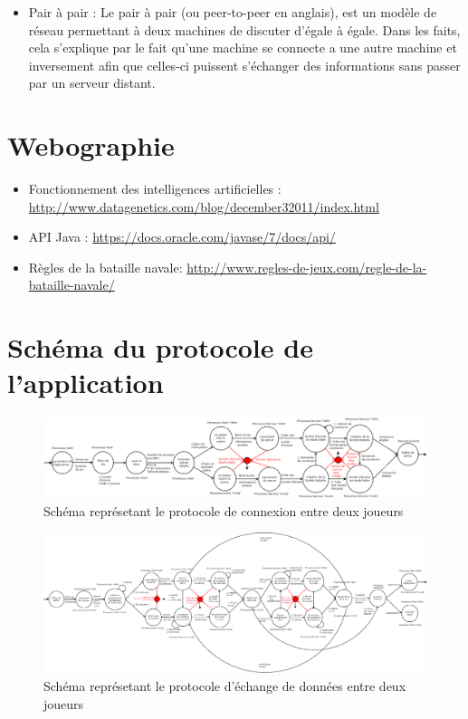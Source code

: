 \begin{appendices}
\begin{itemize}
	\item Pair à  pair :
    Le pair à  pair (ou peer-to-peer en anglais), est un modèle de réseau permettant à  deux machines de discuter d'égale à  égale.
    Dans les faits, cela s'explique par le fait qu'une machine se connecte a une autre machine et inversement afin que celles-ci puissent s'échanger des informations
    sans passer par un serveur distant.
\end{itemize}


\newpage
\section{Webographie}
\begin{itemize}
	\item Fonctionnement des intelligences artificielles : \url{http://www.datagenetics.com/blog/december32011/index.html}
\newline	
	\item API Java : \url{https://docs.oracle.com/javase/7/docs/api/}
	\newline
	\item Règles de la bataille navale: \url{http://www.regles-de-jeux.com/regle-de-la-bataille-navale/}
\end{itemize}

\newpage
\section{Schéma du protocole de l'application}
\begin{figure}
    \centering
    \includegraphics [width=215mm]{images/connection_between_players.png}
    \caption{Schéma représetant le protocole de connexion entre deux joueurs}
    \label{connection}
\end{figure}
\begin{figure}
    \centering
    \includegraphics [width=215mm]{images/data_exhange_between_players.png}
    \caption{Schéma représetant le protocole d'échange de données entre deux joueurs}
    \label{connection}
\end{figure}

\end{appendices}